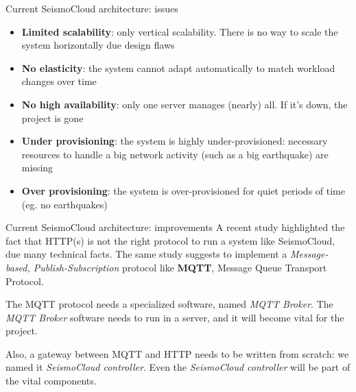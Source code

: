 \begin{frame}{Current SeismoCloud architecture: issues}
\begin{itemize}
  \item \textbf{Limited scalability}: only vertical scalability. There is no way
  to scale the system horizontally due design flaws
  \item \textbf{No elasticity}: the system cannot adapt automatically to match
  workload changes over time
  \item \textbf{No high availability}: only one server manages (nearly) all. If
  it's down, the project is gone
  \item \textbf{Under provisioning}: the system is highly under-provisioned:
  necessary resources to handle a big network activity (such as a big earthquake)
  are missing
  \item \textbf{Over provisioning}: the system is over-provisioned for quiet
  periods of time (eg. no earthquakes)
\end{itemize}
\end{frame}


\begin{frame}{Current SeismoCloud architecture: improvements}
	A recent study highlighted the fact that HTTP(s) is not the right protocol to
	run a system like SeismoCloud, due many technical facts. The same study suggests
	to implement a \textit{Message-based, Publish-Subscription} protocol like
	\textbf{MQTT}, Message Queue Transport Protocol.

	\vspace{1em}

	The MQTT protocol needs a specialized software, named \textit{MQTT Broker}.
	The \textit{MQTT Broker} software needs to run in a server, and it will become
	vital for the project.

	\vspace{1em}

	Also, a gateway between MQTT and HTTP needs to be written from scratch: we named
	it \textit{SeismoCloud controller}. Even the \textit{SeismoCloud controller}
	will be part of the vital components.

\end{frame}
